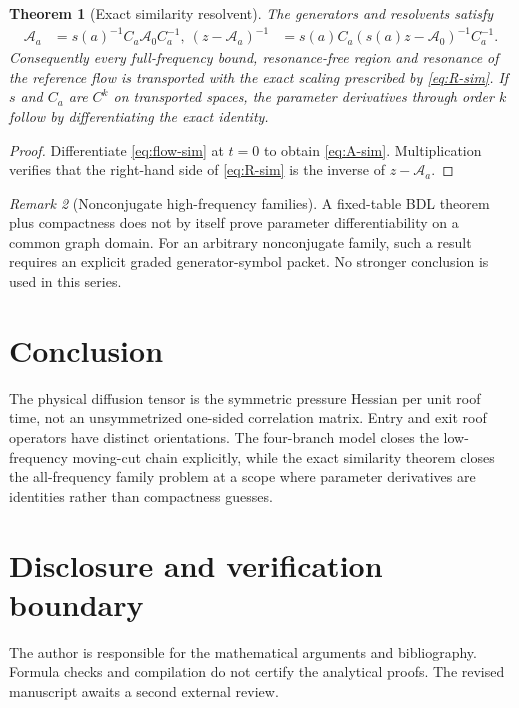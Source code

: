 \documentclass[11pt,reqno]{amsart}
\newtheorem{theorem}{Theorem}[section]
\theoremstyle{definition}
\theoremstyle{remark}
\newtheorem{remark}[theorem]{Remark}
\begin{document}
\begin{theorem}[Exact similarity resolvent]\label{thm:similarity}
The generators and resolvents satisfy
\begin{align}
 \mathcal A_a&=s(a)^{-1}C_a\mathcal A_0C_a^{-1},
 \label{eq:A-sim}\
 (z-\mathcal A_a)^{-1}
 &=s(a)C_a(s(a)z-\mathcal A_0)^{-1}C_a^{-1}.
 \label{eq:R-sim}
\end{align}
Consequently every full-frequency bound, resonance-free region and resonance
of the reference flow is transported with the exact scaling prescribed by
\eqref{eq:R-sim}.  If $s$ and $C_a$ are $C^k$ on transported spaces, the
parameter derivatives through order $k$ follow by differentiating the exact
identity.
\end{theorem}

\begin{proof}
Differentiate \eqref{eq:flow-sim} at $t=0$ to obtain \eqref{eq:A-sim}.
Multiplication verifies that the right-hand side of \eqref{eq:R-sim} is the
inverse of $z-\mathcal A_a$.
\end{proof}

\begin{remark}[Nonconjugate high-frequency families]
A fixed-table BDL theorem plus compactness does not by itself prove
parameter differentiability on a common graph domain.  For an arbitrary
nonconjugate family, such a result requires an explicit graded generator-symbol
packet.  No stronger conclusion is used in this series.
\end{remark}

\section{Conclusion}

The physical diffusion tensor is the symmetric pressure Hessian per unit roof
time, not an unsymmetrized one-sided correlation matrix.  Entry and exit roof
operators have distinct orientations.  The four-branch model closes the
low-frequency moving-cut chain explicitly, while the exact similarity theorem
closes the all-frequency family problem at a scope where parameter derivatives
are identities rather than compactness guesses.

\section*{Disclosure and verification boundary}
The author is responsible for the mathematical arguments and bibliography.
Formula checks and compilation do not certify the analytical proofs.  The
revised manuscript awaits a second external review.



\end{document}
